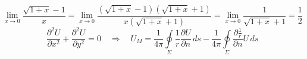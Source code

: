 \documentclass{article}
\begin{document}
\begin{equation}
\lim_{x\to0}\frac{\sqrt{1+x} - 1}{x} =
\lim_{x\to0}\frac{(\sqrt{1+x} - 1)(\sqrt{1+x} + 1)}{x(\sqrt{1+x} + 1)} =
\lim_{x\to0}\frac{1}{\sqrt{1+x} + 1} = \frac{1}{2}
\end{equation}
\begin{equation}
\frac{\partial^2 U}{\partial x^2} + \frac{\partial^2 U}{\partial y^2} = 0\quad
\Longrightarrow\quad 
U_M = \frac{1}{4\pi}\oint\limits_\Sigma\frac{1}{r}\frac{\partial U}{\partial n}
\,ds - \frac{1}{4\pi}\oint\limits_\Sigma\frac{\partial\frac{1}{r}}{\partial n}
U\,ds
\end{equation}
\end{document}
